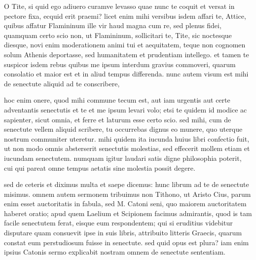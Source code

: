 
 O Tite, si quid ego adiuero curamve levasso quae nunc te coquit et versat in pectore fixa, ecquid erit praemi? licet enim mihi versibus isdem affari te, Attice, quibus affatur Flamininum ille vir haud magna cum re, sed plenus fidei, quamquam certo scio non, ut Flamininum, sollicitari te, Tite, sic noctesque diesque, novi enim moderationem animi tui et aequitatem, teque non cognomen solum Athenis deportasse, sed humanitatem et prudentiam intellego. et tamen te suspicor isdem rebus quibus me ipsum interdum gravius commoveri, quarum consolatio et maior est et in aliud tempus differenda. nunc autem visum est mihi de senectute aliquid ad te conscribere,

 hoc enim onere, quod mihi commune tecum est, aut iam urgentis aut certe adventantis senectutis et te et me ipsum levari volo; etsi te quidem id modice ac sapienter, sicut omnia, et ferre et laturum esse certo scio. sed mihi, cum de senectute vellem aliquid scribere, tu occurrebas dignus eo munere, quo uterque nostrum communiter uteretur. mihi quidem ita iucunda huius libri confectio fuit, ut non modo omnis absterserit senectutis molestias, sed effecerit mollem etiam et iucundam senectutem. numquam igitur laudari satis digne philosophia poterit, cui qui pareat omne tempus aetatis sine molestia possit degere.

 sed de ceteris et diximus multa et saepe dicemus: hunc librum ad te de senectute misimus. omnem autem sermonem tribuimus non Tithono, ut Aristo Cius, parum enim esset auctoritatis in fabula, sed M. Catoni seni, quo maiorem auctoritatem haberet oratio; apud quem Laelium et Scipionem facimus admirantis, quod is tam facile senectutem ferat, eisque eum respondentem; qui si eruditius videbitur disputare quam consuevit ipse in suis libris, attribuito litteris Graecis, quarum constat eum perstudiosum fuisse in senectute. sed quid opus est plura? iam enim ipsius Catonis sermo explicabit nostram omnem de senectute sententiam.

